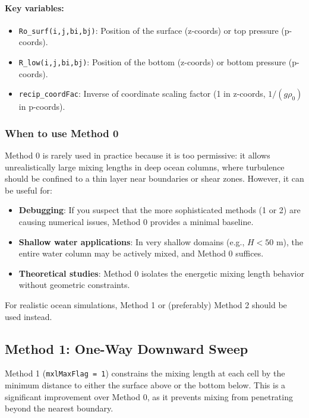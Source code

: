 \documentclass[12pt,letterpaper]{article}
\begin{document}
\paragraph{Key variables:}
\begin{itemize}
\item \verb|Ro_surf(i,j,bi,bj)|: Position of the surface (z-coords) or top pressure (p-coords).
\item \verb|R_low(i,j,bi,bj)|: Position of the bottom (z-coords) or bottom pressure (p-coords).
\item \verb|recip_coordFac|: Inverse of coordinate scaling factor (1 in z-coords, $1/(g\rho_0)$ in p-coords).
\end{itemize}

\subsubsection{When to use Method 0}

Method 0 is rarely used in practice because it is too permissive: it allows unrealistically large mixing lengths in deep ocean columns, where turbulence should be confined to a thin layer near boundaries or shear zones. However, it can be useful for:
\begin{itemize}
\item \textbf{Debugging}: If you suspect that the more sophisticated methods (1 or 2) are causing numerical issues, Method 0 provides a minimal baseline.
\item \textbf{Shallow water applications}: In very shallow domains (e.g., $H < 50$ m), the entire water column may be actively mixed, and Method 0 suffices.
\item \textbf{Theoretical studies}: Method 0 isolates the energetic mixing length behavior without geometric constraints.
\end{itemize}

For realistic ocean simulations, Method 1 or (preferably) Method 2 should be used instead.

\subsection{Method 1: One-Way Downward Sweep}
\label{sec:mxl_method1}

Method 1 (\verb|mxlMaxFlag = 1|) constrains the mixing length at each cell by the minimum distance to either the surface above or the bottom below. This is a significant improvement over Method 0, as it prevents mixing from penetrating beyond the nearest boundary.
\end{document}
